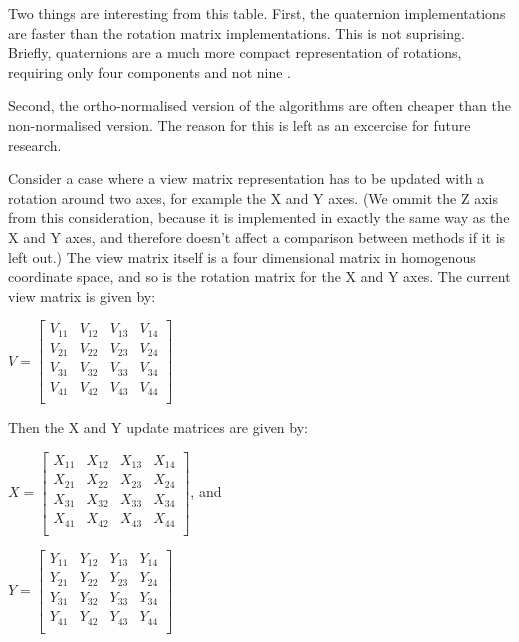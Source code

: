 \documentclass{acm_proc_article-sp}
\begin{document}
Two things are interesting from this table.
First, the quaternion implementations are faster than the rotation matrix implementations.
This is not suprising.
Briefly, quaternions are a much more compact representation of rotations, requiring only four components and not nine \cite{taylor79}.

Second, the ortho-normalised version of the algorithms are often cheaper than the non-normalised version.
The reason for this is left as an excercise for future research.

Consider a case where a view matrix representation has to be updated with a rotation around two axes, for example the X and Y axes.
(We ommit the Z axis from this consideration, because it is implemented in exactly the same way as the X and Y axes, and therefore doesn't affect a comparison between methods if it is left out.)
The view matrix itself is a four dimensional matrix in homogenous coordinate space, and so is the rotation matrix for the X and Y axes.
The current view matrix is given by:

$V = \left[ \begin{array}{cccc}
    V_{11} & V_{12} & V_{13} & V_{14} \\
    V_{21} & V_{22} & V_{23} & V_{24} \\
    V_{31} & V_{32} & V_{33} & V_{34} \\
    V_{41} & V_{42} & V_{43} & V_{44} \\
\end{array} \right]$

Then the X and Y update matrices are given by:

\vspace{0.5em}
$X = \left[ \begin{array}{cccc}
    X_{11} & X_{12} & X_{13} & X_{14} \\
    X_{21} & X_{22} & X_{23} & X_{24} \\
    X_{31} & X_{32} & X_{33} & X_{34} \\
    X_{41} & X_{42} & X_{43} & X_{44} \\
\end{array} \right]$, and

$Y = \left[ \begin{array}{cccc}
    Y_{11} & Y_{12} & Y_{13} & Y_{14} \\
    Y_{21} & Y_{22} & Y_{23} & Y_{24} \\
    Y_{31} & Y_{32} & Y_{33} & Y_{34} \\
    Y_{41} & Y_{42} & Y_{43} & Y_{44} \\
\end{array} \right]$
\end{document}

